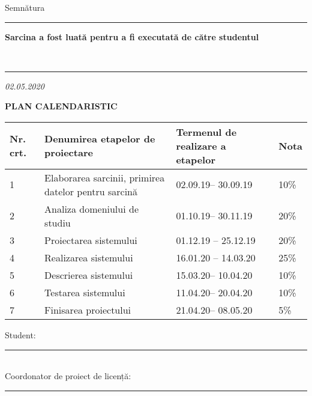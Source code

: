 \begin{titlepage}
    \vspace{0.4cm}
    \hfill Semnătura  \ \rule{5cm}{0.2mm}
    \vspace{0.8cm}
    
    \textbf{Sarcina a fost luată pentru a fi executată de către studentul } \MyName
    
    \vspace{0.2cm}
    \ \rule{5cm}{0.2mm} \textit{02.05.2020}
    
    \vspace{0.8cm}
    \textbf{PLAN CALENDARISTIC}
    \vspace{0.4cm}
    
    \begin{tabular}{ |p{1cm}||p{8cm}|p{5cm}|p{2cm}|  }
        \hline
        \textbf{Nr. crt.} & \textbf{Denumirea etapelor de proiectare }   &\textbf{Termenul de realizare a \newline etapelor }& \textbf{Nota}  \\

        \hline
        1 & Elaborarea sarcinii, primirea datelor pentru \newline sarcină  & 02.09.19– 30.09.19 & 10\% \\

        \hline
        2 & Analiza domeniului de studiu & 01.10.19– 30.11.19 & 20\%\\

        \hline
        3 & Proiectarea sistemului & 01.12.19 – 25.12.19 & 20\% \\

        \hline
        4 & Realizarea sistemului & 16.01.20 – 14.03.20 & 25\% \\

        \hline
        5 & Descrierea sistemului & 15.03.20– 10.04.20 & 10\% \\

        \hline
        6 & Testarea sistemului & 11.04.20– 20.04.20 & 10\% \\
        
        \hline
        7 & Finisarea proiectului & 21.04.20– 08.05.20 & 5\% \\
        
        \hline
    \end{tabular}
    
    \vspace{1cm}
    \hfill Student: \rule{4.5cm}{0.2mm} \MyName\\
    \vspace{0.2cm}
    \hfill Coordonator de proiect de licență: \rule{4.5cm}{0.2mm} \Coordonator\\
    \vspace{0.2cm}

\end{titlepage}

